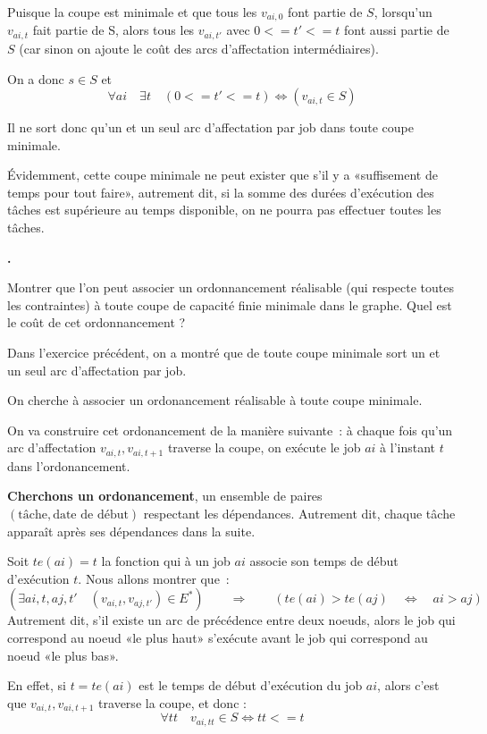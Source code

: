 \documentclass{article}
\newcounter{enoncecount}
\newenvironment{enonce}
{
\stepcounter{enoncecount}
\bf\small \arabic{enoncecount}.
\begin{bf}
}
{
\end{bf}
}
\begin{document}
Puisque la coupe est minimale et que tous les $v_{ai,0}$ font partie de $S$, lorsqu'un $v_{ai,t}$ fait partie de S, alors tous les
$v_{ai,t'}$ avec $0 <= t' <= t$ font aussi partie de $S$ (car sinon on ajoute le coût des arcs d'affectation intermédiaires).

On a donc $s \in S$ et
\begin{equation}
\forall ai \quad \exists t \quad (0 <= t' <= t) \Leftrightarrow (v_{ai,t} \in S)
\label{eq:tous-t-debut-ligne}
\end{equation}

Il ne sort donc qu'un et un seul arc d'affectation par job dans toute coupe minimale.

Évidemment, cette coupe minimale ne peut exister que s'il y a «suffisement de temps pour tout faire», autrement dit, si la somme des durées
d'exécution des tâches est supérieure au temps disponible, on ne pourra pas effectuer toutes les tâches.

\begin{enonce}
Montrer que l'on peut associer un ordonnancement réalisable (qui respecte toutes les contraintes) à toute 
coupe de capacité finie minimale dans le graphe. Quel est le coût de cet ordonnancement ? 
\end{enonce}

Dans l'exercice précédent, on a montré que de toute coupe minimale sort un et un seul arc d'affectation par job.

On cherche à associer un ordonancement réalisable à toute coupe minimale.

On va construire cet ordonancement de la manière suivante~: à chaque
fois qu'un arc d'affectation $v_{ai,t}, v_{ai,t+1}$ traverse la coupe,
on exécute le job $ai$ à l'instant $t$ dans l'ordonancement. 

\textbf{Cherchons un ordonancement}, un ensemble de paires $(\text{tâche},\text{date de début})$ respectant les dépendances.
Autrement dit, chaque tâche apparaît après ses dépendances dans la suite.

Soit $te(ai) = t$ la fonction qui à un job $ai$ associe son temps de début d'exécution $t$.
Nous allons montrer que~:
$$(\exists ai,t,aj,t' \quad (v_{ai,t},v_{aj,t'}) \in E^*) \qquad \Rightarrow \qquad (te(ai) > te(aj) \quad \Leftrightarrow \quad ai > aj)$$
Autrement dit, s'il existe un arc de précédence entre deux noeuds, alors le job qui
correspond au noeud «le plus haut» s'exécute avant le job qui correspond au
noeud «le plus bas».

En effet, si $t = te(ai)$ est le temps de début d'exécution du job $ai$, alors c'est que $v_{ai,t}, v_{ai,t+1}$
traverse la coupe, et donc :
\begin{equation}
  \forall tt \quad v_{ai,tt} \in S \Leftrightarrow tt <= t
  \label{eq:tous-t-avant-exec}
\end{equation}
\end{document}
